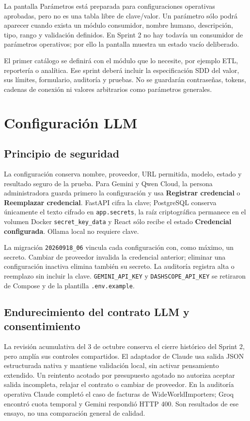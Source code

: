 \documentclass[11pt,letterpaper]{article}
\newcommand{\file}[1]{\texttt{#1}}
\begin{document}
La pantalla Parámetros está preparada para configuraciones operativas aprobadas, pero no es una tabla libre de clave/valor. Un parámetro sólo podrá aparecer cuando exista un módulo consumidor, nombre humano, descripción, tipo, rango y validación definidos. En Sprint 2 no hay todavía un consumidor de parámetros operativos; por ello la pantalla muestra un estado vacío deliberado.

El primer catálogo se definirá con el módulo que lo necesite, por ejemplo ETL, reportería o analítica. Ese sprint deberá incluir la especificación SDD del valor, sus límites, formulario, auditoría y pruebas. No se guardarán contraseñas, tokens, cadenas de conexión ni valores arbitrarios como parámetros generales.

\section{Configuración LLM}

\subsection{Principio de seguridad}

La configuración conserva nombre, proveedor, URL permitida, modelo, estado y resultado seguro de la prueba. Para Gemini y Qwen Cloud, la persona administradora guarda primero la configuración y usa \textbf{Registrar credencial} o \textbf{Reemplazar credencial}. FastAPI cifra la clave; PostgreSQL conserva únicamente el texto cifrado en \file{app.secrets}, la raíz criptográfica permanece en el volumen Docker \file{secret\_key\_data} y React sólo recibe el estado \textbf{Credencial configurada}. Ollama local no requiere clave.

La migración \file{20260918\_06} vincula cada configuración con, como máximo, un secreto. Cambiar de proveedor invalida la credencial anterior; eliminar una configuración inactiva elimina también su secreto. La auditoría registra alta o reemplazo sin incluir la clave. \file{GEMINI\_API\_KEY} y \file{DASHSCOPE\_API\_KEY} se retiraron de Compose y de la plantilla \file{.env.example}.

\subsection{Endurecimiento del contrato LLM y consentimiento}

La revisión acumulativa del 3 de octubre conserva el cierre histórico del Sprint 2,
pero amplía sus controles compartidos. El adaptador de Claude usa salida JSON
estructurada nativa y mantiene validación local, sin activar pensamiento extendido.
Un reintento acotado por presupuesto agotado no autoriza aceptar salida incompleta,
relajar el contrato o cambiar de proveedor. En la auditoría operativa Claude completó
el caso de facturas de WideWorldImporters; Groq encontró cuota temporal y Gemini
respondió HTTP 400. Son resultados de ese ensayo, no una comparación general de calidad.
\end{document}
